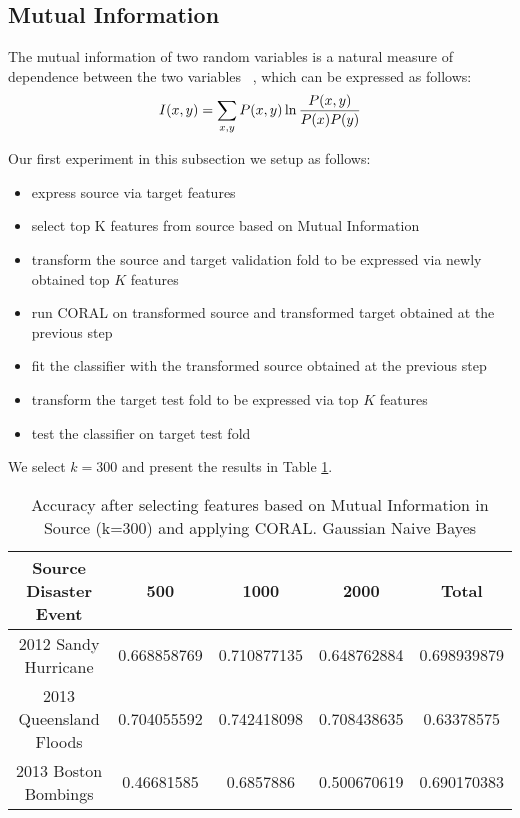 \subsection{Mutual Information}

The mutual information of two random variables is a natural measure of dependence between the two variables ~\citep{hastie}, which can be expressed as follows: \[I(x,y) = \sum_{x,y} P(x,y) \ln {{P(x,y)}\over{P(x) P(y)}} \]

Our first experiment in this subsection we setup as follows:
  \begin{itemize}
  \item express source via target features
  \item select top K features from source based on Mutual Information
  \item transform the source and target validation fold to be expressed via newly obtained top $K$ features 
  \item run CORAL on transformed source and transformed target obtained at the previous step
  \item fit the classifier with the transformed source obtained at the previous step
  \item transform the target test fold to be expressed via top $K$ features
  \item test the classifier on target test fold
  \end{itemize}

We select $k=300$ and present the results in Table \ref{tablemisource300}. 

\begin{table}[ht]
    \begin{center}
    \caption{Accuracy after selecting features based on Mutual Information in Source (k=300) and applying CORAL. Gaussian Naive Bayes}
    \begin{tabular}[c]{|c|c|c|c|c|}
        \hline
        Source Disaster Event & 500 & 1000 & 2000 & Total \\
        \hline
        2012 Sandy Hurricane & 0.668858769 & 0.710877135 & 0.648762884 & 0.698939879 \\
        2013 Queensland Floods & 0.704055592 & 0.742418098 & 0.708438635 & 0.63378575 \\
        2013 Boston Bombings & 0.46681585 & 0.6857886 & 0.500670619 & 0.690170383 \\
        \hline
    \end{tabular}
    \label{tablemisource300}
   \end{center}
\end{table}

